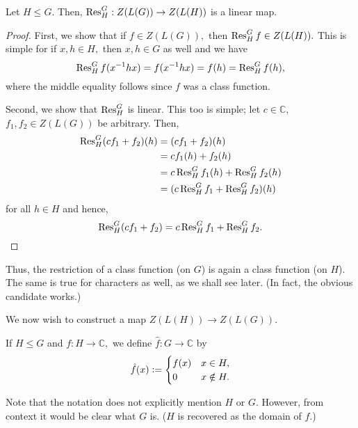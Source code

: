 \begin{prop}
	Let $H \le G.$ Then, $\operatorname{Res}^{G}_{H} : Z(L(G)) \to Z(L(H))$ is a linear map.
\end{prop}
\begin{proof} 
	First, we show that if $f \in Z(L(G)),$ then $\operatorname{Res}^{G}_{H}f \in Z(L(H)).$ This is simple for if $x, h \in H,$ then $x, h \in G$ as well and we have
	\begin{equation*} 
		\operatorname{Res}^{G}_{H}f(x^{-1}hx) = f(x^{-1}hx) = f(h) = \operatorname{Res}^{G}_{H}f(h),
	\end{equation*}
	where the middle equality follows since $f$ was a class function.

	Second, we show that $\operatorname{Res}^{G}_{H}$ is linear. This too is simple; let $c \in \mathbb{C},$ $f_1, f_2 \in Z(L(G))$ be arbitrary. Then,
	\begin{align*} 
		\operatorname{Res}^{G}_{H}(cf_1 + f_2)(h) &= (cf_1 + f_2)(h)\\
		&= cf_1(h) + f_2(h)\\
		&= c\operatorname{Res}^{G}_{H}f_1(h) + \operatorname{Res}^{G}_{H}f_2(h)\\
		&= (c\operatorname{Res}^{G}_{H}f_1 + \operatorname{Res}^{G}_{H}f_2)(h)
	\end{align*}
	for all $h \in H$ and hence,
	\begin{equation*} 
		\operatorname{Res}^{G}_{H}(cf_1 + f_2) = c\operatorname{Res}^{G}_{H}f_1 + \operatorname{Res}^{G}_{H}f_2. \qedhere
	\end{equation*}
\end{proof}

Thus, the restriction of a class function (on $G$) is again a class function (on $H$). The same is true for characters as well, as we shall see later. (In fact, the obvious candidate works.)

We now wish to construct a map $Z(L(H)) \to Z(L(G)).$

\begin{defn}
	If $H \le G$ and $f : H \to \mathbb{C},$ we define $\hat{f} : G \to \mathbb{C}$ by
	\begin{equation*} 
		\hat{f}(x) \vcentcolon= \begin{cases}
			f(x) & x \in H,\\
			0 & x \notin H.
		\end{cases}
	\end{equation*}
\end{defn}
\begin{rem}
	Note that the notation does not explicitly mention $H$ or $G.$ However, from context it would be clear what $G$ is. ($H$ is recovered as the domain of $f.$)
\end{rem}

